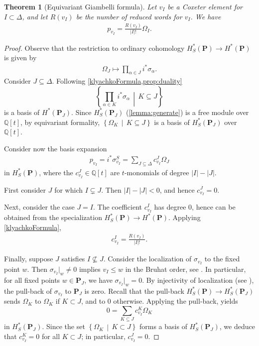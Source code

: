 \documentclass[10pt]{article}
\newtheorem{thm}{Theorem}
\numberwithin{thm}{section}
\theoremstyle{definition}
\theoremstyle{remark}
\newcommand{\Pet}{\ensuremath{\mathbf{P}}}
\newcommand{\IQ}{\mathbb Q}
\newcommand{\set}[2]{\left\{#1\,\middle\vert\,#2\right\}}
\begin{document}
\begin{thm}[Equivariant Giambelli formula]
\label{Giambelli}
Let $v_I$ be a Coxeter element for $I\subset\Delta$,
and let $R(v_I)$ be the number of reduced words for $v_I$.
We have
\begin{align*}
p_{v_I}=\frac{R(v_I)}{|I|!} \Omega_I.
\end{align*}
\end{thm}
\begin{proof}
Observe that the restriction to ordinary cohomology $H^*_S(\Pet)\to H^*(\Pet)$
is given by 
\begin{align*}
\Omega_J\mapsto \prod_{\alpha\in J}i^*\sigma_\alpha.
\end{align*}
Consider $J\subseteq \Delta$.
Following \cref{klyachkoFormula,prop:duality} %
$$\set{\prod_{\alpha\in K}i^*\sigma_\alpha}{K\subseteq J}$$ 
is a basis of $H^*(\Pet_J)$.
Since $H^*_S(\Pet_J)$ (\cref{lemma:generate}) is a free module over $\IQ[t]$, by equivariant formality, $\set{\Omega_K}{K\subseteq J}$ is a basis of $H^*_S(\Pet_J)$ over $\IQ[t]$.

Consider now the basis expansion 
\begin{align}
\label{pvExpansion}
p_{v_I}=i^*\sigma_{v_I }^{S}=\sum_{J\subseteq\Delta} c_{v_I }^J\Omega_J
\end{align}
in $H^*_S(\Pet)$,
where the $c_{v_I}^J\in\IQ[t]$ are $t$-monomials of degree $|I|-|J|$.

First consider $J$ for which $I\subsetneq J$.
Then $|I|-|J|<0$, and hence $c_{v_I}^J= 0$.

Next, consider the case $J=I$.
The coefficient $c_{v_I}^I$ has degree $0$, hence can be obtained from the specialization $H^*_S(\Pet)\to H^*(\Pet)$.
Applying \cref{klyachkoFormula}, 
\begin{align*}
c_{v_I }^I=\frac{R(v_I)}{|I|!}.
\end{align*}

Finally, suppose $J$ satisfies $I\not\subseteq J$.
Consider the localization of $\sigma_{v_I}$ to the fixed point $w$.
Then $\sigma_{v_I}|_w\neq0$ implies $v_I\leq w$ in the Bruhat order, see \cite{billey:kostant}. %
In particular, for all fixed points $w\in \Pet_J$, we have $\sigma_{v_I}|_w=0$. %
By injectivity of localization (see \cite[Thm. 3.1]{drellich:monk}), the pull-back of $\sigma_{v_I}$ to $\Pet_J$ is zero.
Recall that the pull-back $H^*_S(\Pet)\to H^*_S(\Pet_J)$ sends $\Omega_K$ to $\Omega_K$ if $K\subset J$, and to $0$ otherwise.
Applying the pull-back,  yields
$$
0 = \sum_{K\subseteq J} c_{v_I }^K \Omega_K
$$
in $H^*_S(\Pet_J)$.
Since the set $\set{\Omega_K}{K\subset J}$ forms a basis of $H^*_S(\Pet_J)$, we deduce that $c_{v_I}^K=0$ for all $K\subset J$;
in particular, $c_{v_I}^J=0$.
\end{proof}
\end{document}
